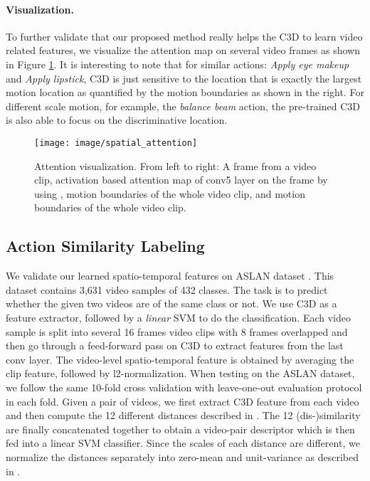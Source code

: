 \documentclass[10pt,twocolumn,letterpaper]{article}
\begin{document}
\vspace{-3mm}
\paragraph{Visualization.} To further validate that our proposed method really helps the C3D to learn video related features, we visualize the attention map \cite{zagoruyko2016paying} on several video frames as shown in Figure \ref{fig:attention}. It is interesting to note that for similar actions: \textit{Apply eye makeup} and \textit{Apply lipstick}, C3D is just sensitive to the location that is exactly the largest motion location as quantified by the motion boundaries as shown in the right. For different scale motion, for example, the \textit{balance beam} action, the pre-trained C3D is also able to focus on the discriminative location.  

\begin{figure}[t]
\begin{center}
   \texttt{[image: image/spatial\_attention]} 
\end{center}\vspace{-3mm}
   \caption{Attention visualization. From left to right: A frame from a video clip, activation based attention map of conv5 layer on the frame by using \cite{zagoruyko2016paying}, motion boundaries  of the whole video clip, and motion boundaries  of the whole video clip.}
\label{fig:attention}\vspace{-4mm}
\end{figure}
 
\subsection{Action Similarity Labeling}
We validate our learned spatio-temporal features on ASLAN dataset \cite{kliper2012action}. This dataset contains 3,631 video samples of 432 classes. The task is to predict whether the given two videos are of the same class or not. We use C3D as a feature extractor, followed by a \textit{linear} SVM to do the classification. Each video sample is split into several 16 frames video clips with 8 frames overlapped and then go through a feed-forward pass on C3D to extract features from the last conv layer. The video-level spatio-temporal feature is obtained by averaging the clip feature, followed by l2-normalization. When testing on the ASLAN dataset, we follow the same 10-fold cross validation with leave-one-out evaluation protocol in each fold. Given a pair of videos, we first extract C3D feature from each video and then compute the 12 different distances described in \cite{kliper2012action}. The 12 (dis-)similarity are finally concatenated together to obtain a video-pair descriptor which is then fed into a linear SVM classifier. 
Since the scales of each distance are different, we normalize the distances separately into zero-mean and unit-variance as described in \cite{tran2015learning}. 
\end{document}
